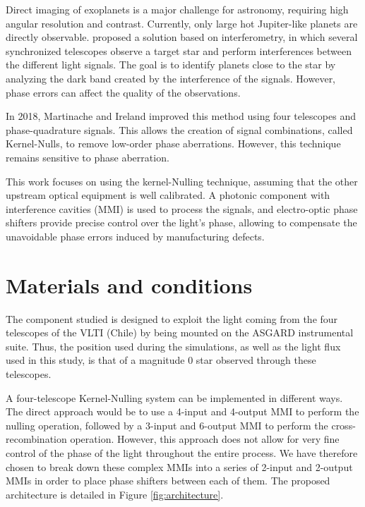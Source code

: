 \documentclass{aa}
\begin{document}
    Direct imaging of exoplanets is a major challenge for astronomy, requiring high angular resolution and contrast. Currently, only large hot Jupiter-like planets are directly observable. \cite{Bracewell1979} proposed a solution based on interferometry, in which several synchronized telescopes observe a target star and perform interferences between the different light signals. The goal is to identify planets close to the star by analyzing the dark band created by the interference of the signals. However, phase errors can affect the quality of the observations.
    
    In 2018, Martinache and Ireland \cite{Martinache2018} improved this method using four telescopes and phase-quadrature signals. This allows the creation of signal combinations, called Kernel-Nulls, to remove low-order phase aberrations. However, this technique remains sensitive to phase aberration.
    
    This work focuses on using the kernel-Nulling technique, assuming that the other upstream optical equipment is well calibrated. A photonic component with interference cavities (MMI) \cite{Soldano1995} is used to process the signals, and electro-optic phase shifters provide precise control over the light's phase, allowing to compensate the unavoidable phase errors induced by manufacturing defects.
    
    
    \section{Materials and conditions}
    
        The component studied is designed to exploit the light coming from the four telescopes of the VLTI (Chile) by being mounted on the ASGARD instrumental suite. Thus, the position used during the simulations, as well as the light flux used in this study, is that of a magnitude 0 star observed through these telescopes.
    
        A four-telescope Kernel-Nulling system can be implemented in different ways. The direct approach would be to use a 4-input and 4-output MMI to perform the nulling operation, followed by a 3-input and 6-output MMI to perform the cross-recombination operation. However, this approach does not allow for very fine control of the phase of the light throughout the entire process. We have therefore chosen to break down these complex MMIs into a series of 2-input and 2-output MMIs in order to place phase shifters between each of them. The proposed architecture is detailed in Figure \ref{fig:architecture}.
    
\end{document}
